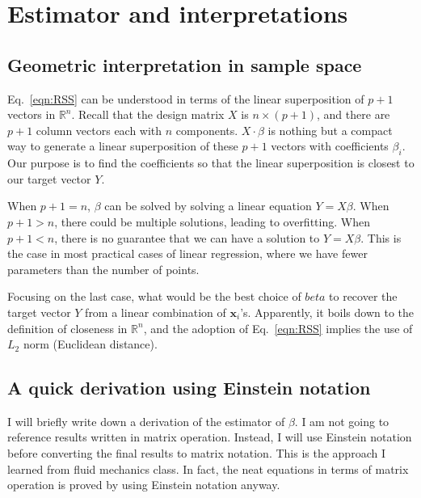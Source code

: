 \section{Estimator and interpretations}
\subsection{Geometric interpretation in sample space}
Eq.~\ref{eqn:RSS} can be understood in terms of the linear superposition of $p+1$ vectors in $\mathbb{R}^{n}$. Recall that the design matrix $X$ is $n\times(p+1)$, and there are $p+1$ column vectors each with $n$ components. $X\cdot\beta$ is nothing but a compact way to generate a linear superposition of these $p+1$ vectors with coefficients $\beta_i$. Our purpose is to find the coefficients so that the linear superposition is closest to our target vector $Y$.

When $p+1 = n$, $\beta$ can be solved by solving a linear equation $Y=X\beta$. When $p+1 > n$, there could be multiple solutions, leading to overfitting. When $p+1 < n$, there is no guarantee that we can have a solution to $Y=X\beta$. This is the case in most practical cases of linear regression, where we have fewer parameters than the number of points.

Focusing on the last case, what would be the best choice of $beta$ to recover the target vector $Y$ from a linear combination of $\mathbf{x}_i$'s. Apparently, it boils down to the definition of closeness in $\mathbb{R}^n$, and the adoption of Eq.~\ref{eqn:RSS} implies the use of $L_2$ norm (Euclidean distance).
\subsection{A quick derivation using Einstein notation}
I will briefly write down a derivation of the estimator of $\beta$. I am not going to reference results written in matrix operation. Instead, I will use Einstein notation before converting the final results to matrix notation. This is the approach I learned from fluid mechanics class. In fact, the neat equations in terms of matrix operation is proved by using Einstein notation anyway.

